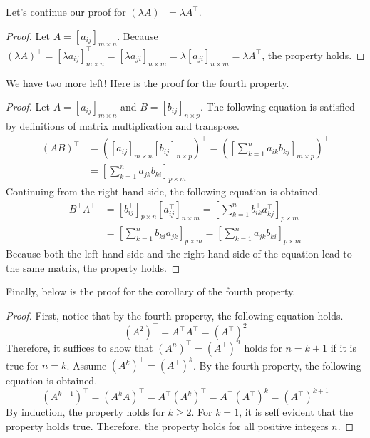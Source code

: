 \documentclass[../main.tex]{subfiles}
\begin{document}
Let's continue our proof for $(\lambda A)^\intercal =
\lambda A^\intercal$.

\begin{proof}
Let $A = [a_{ij}]_{m \times n}$. Because
$(\lambda A)^\intercal
= [\lambda a_{ij}]_{m \times n}^\intercal
= [\lambda a_{ji}]_{n \times m}
= \lambda [a_{ji}]_{n \times m}
= \lambda A^\intercal$, the property holds.
\end{proof}

We have two more left! Here is the proof for the fourth property.

\begin{proof}
Let $A = [a_{ij}]_{m \times n}$ and $B = [b_{ij}]_{n \times p}$.
The following equation is satisfied by definitions of matrix
multiplication and transpose.
\begin{align*}
    (AB)^\intercal
    &= \left(
        [a_{ij}]_{m \times n} [b_{ij}]_{n \times p}
    \right)^\intercal
    = \left(
        \left[ \sum_{k = 1}^{n} a_{ik} b_{kj} \right]_{m \times p}
    \right)^\intercal \\
    &= \left[ \sum_{k = 1}^{n} a_{jk} b_{ki} \right]_{p \times m}
\end{align*}
Continuing from the right hand side, the following equation is
obtained.
\begin{align*}
    B^\intercal A^\intercal
    &= \left[ b_{ij}^\intercal \right]_{p \times n}
        \left[ a_{ij}^\intercal \right]_{n \times m}
    = \left[
        \sum_{k = 1}^{n} b_{ik}^\intercal a_{kj}^\intercal
    \right]_{p \times m} \\
    &= \left[ \sum_{k = 1}^{n} b_{ki} a_{jk} \right]_{p \times m}
    = \left[ \sum_{k = 1}^{n} a_{jk} b_{ki} \right]_{p \times m}
\end{align*}
Because both the left-hand side and the right-hand side of the
equation lead to the same matrix, the property holds.
\end{proof}

Finally, below is the proof for the corollary of the fourth property.

\begin{proof}
First, notice that by the fourth property, the following equation
holds.
\[
\left( A^2 \right)^\intercal
= A^\intercal A^\intercal
= \left( A^\intercal \right)^2
\]
Therefore, it suffices to show that $(A^n)^\intercal =
(A^\intercal)^n$ holds for $n = k + 1$ if it is true for $n = k$.
Assume $(A^k)^\intercal = (A^\intercal)^k$. By the fourth property,
the following equation is obtained.
\[
\left( A^{k+1} \right)^\intercal
= (A^k A)^\intercal
= A^\intercal (A^k)^\intercal
= A^\intercal (A^\intercal)^k
= (A^\intercal)^{k + 1}
\]
By induction, the property holds for $k \geq 2$. For $k = 1$,
it is self evident that the property holds true. Therefore, the
property holds for all positive integers $n$.
\end{proof}
\end{document}
